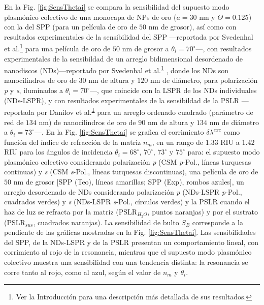 En la Fig. \ref{fig:SensThetai} se compara la sensibilidad del supuesto modo  plasmónico colectivo de una monocapa de NPs de oro ($a=30$ nm y $\Theta=0.125$) con la del SPP (para un película de oro de $50$ nm de grosor), así como con resultados experimentales de la sensibilidad del SPP ---reportada por  Svedenhal et al.\footnote{\label{fn:Motivacion}Ver la Introducción para una descripción más detallada de sus resultados.} \cite{svedendahl2009refractometric} para una película de oro de $50$ nm de grosor a $\theta_i = 70^\circ$---, con resultados experimentales de la sensibildad de un  arreglo bidimensional desordenado de nanodiscos (NDs)---reportado por Svedenhal et al.\textsuperscript{\ref{fn:Motivacion}}  \cite{svedendahl2009refractometric}, donde los NDs son nanocilindros de oro de $30$ nm de altura y $120$ nm de diámetro, para polarización \emph{p} y \emph{s}, iluminados a $\theta_i = 70^\circ$---, que coincide con la LSPR de los NDs individuales (NDs-LSPR), y con resultados experimentales de la sensibildad de la PSLR ---reportada por Danilov et al.\textsuperscript{\ref{fn:Motivacion}} \cite{danilov2018ultra} para un arreglo ordenado cuadrado (parámetro de red de $134$ nm) de nanocilindros de oro de $90$ nm de altura y $134$ nm de diámetro a $\theta_i= 73^\circ$---. En la Fig. \ref{fig:SensThetai} se grafica el corrimiento $\delta\lambda^{exc}$ como función del índice de refracción de la matriz $n_m$, en un rango de $1.33$ RIU a $1.42$ RIU para los ángulos de incidencia $\theta_i = 68^\circ$, $70^\circ$, $73^\circ$ y $75^\circ$ para: el supuesto modo  plasmónico colectivo considerando polarización \emph{p} (CSM \textit{p}-Pol., líneas turquesas continuas) y \emph{s} (CSM \textit{s}-Pol., líneas turquesas discontinuas), una película de oro de $50$ nm de grosor [SPP (Teo), líneas amarillas; SPP (Exp), rombos azules], un arreglo desordenado de NDs  considerando polarización \emph{p} (NDs-LSPR \emph{p}-Pol., cuadrados verdes) y \emph{s} (NDs-LSPR \emph{s}-Pol., círculos verdes) y la PSLR cuando el haz de luz se refracta por la matriz (PSLR$_{H_{2}O}$, puntos naranjas) y por el sustrato (PSLR$_{sus}$, cuadrados naranjas). La sensibilidad de bulto $S_B$ corresponde a la pendiente de las gráficas mostradas en la Fig. \ref{fig:SensThetai}. Las sensibilidades del SPP, de la NDs-LSPR y de la PSLR presentan un comportamiento lineal, con corrimiento al rojo de la resonancia, mientras que el supuesto modo  plasmónico colectivo muestra una sensibilidad con una tendencia distinta: la resonancia se corre tanto al rojo, como al azul, según el valor de $n_m$ y $\theta_i$.

